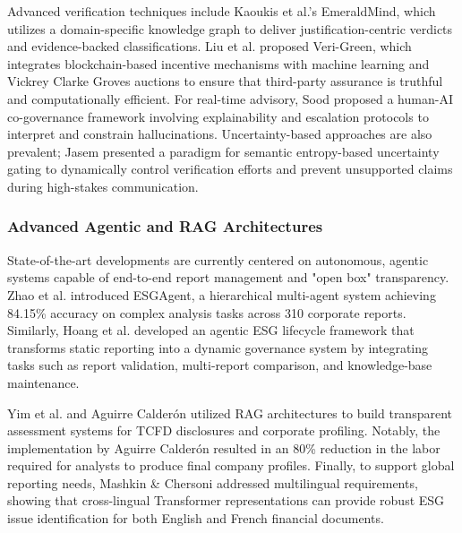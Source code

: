 \documentclass{article}
\begin{document}
Advanced verification techniques include Kaoukis et al.’s  \parencite{kaoukis__georgios_35bab107} EmeraldMind, which utilizes a domain-specific knowledge graph to deliver justification-centric verdicts and evidence-backed classifications. Liu et al.  \parencite{liyuan_liu_91c36432} proposed Veri-Green, which integrates blockchain-based incentive mechanisms with machine learning and Vickrey Clarke Groves auctions to ensure that third-party assurance is truthful and computationally efficient. For real-time advisory, Sood  \parencite{rohit_sood_cb3a4ead} proposed a human-AI co-governance framework involving explainability and escalation protocols to interpret and constrain hallucinations. Uncertainty-based approaches are also prevalent; Jasem  \parencite{al_noor_ali_aziz_jasem_af362154} presented a paradigm for semantic entropy-based uncertainty gating to dynamically control verification efforts and prevent unsupported claims during high-stakes communication.
\subsubsection{Advanced Agentic and RAG Architectures}

State-of-the-art developments are currently centered on autonomous, agentic systems capable of end-to-end report management and "open box" transparency. Zhao et al.  \parencite{yilei_zhao_b7bbd9c8} introduced ESGAgent, a hierarchical multi-agent system achieving 84.15\% accuracy on complex analysis tasks across 310 corporate reports. Similarly, Hoang et al.  \parencite{thong_hoang_d30a390b} developed an agentic ESG lifecycle framework that transforms static reporting into a dynamic governance system by integrating tasks such as report validation, multi-report comparison, and knowledge-base maintenance.

Yim et al.  \parencite{tik_yu_yim_951fa18a} and Aguirre Calderón  \parencite{juan_aguirre_calder_n_5eae82e0} utilized RAG architectures to build transparent assessment systems for TCFD disclosures and corporate profiling. Notably, the implementation by Aguirre Calderón  \parencite{juan_aguirre_calder_n_5eae82e0} resulted in an 80\% reduction in the labor required for analysts to produce final company profiles. Finally, to support global reporting needs, Mashkin \& Chersoni  \parencite{ivan_mashkin_fba24085} addressed multilingual requirements, showing that cross-lingual Transformer representations can provide robust ESG issue identification for both English and French financial documents.
\end{document}
